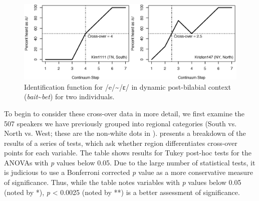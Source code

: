\documentclass[output=paper]{LSP/langsci}
\begin{document}
\begin{figure}[t]
\includegraphics[width=\textwidth]{illustrations/kend_frid_fig2}
\caption{Identification function for /e/{\textasciitilde}/ɛ/ in dynamic post-bilabial context (\textit{bait}{\textasciitilde}\textit{bet}) for two individuals.}
\label{fig:2}
\end{figure}
 
\largerpage
To begin to consider these cross-over data in more detail, we first examine the 507 speakers we have previously grouped into regional categories (South vs. North vs. West; these are the non-white dots in ).  presents a breakdown of the results of a series of  tests, which ask whether region differentiates cross-over points for each variable. The table shows results for Tukey post-hoc tests for the ANOVAs with \textit{p }values below 0.05. Due to the large number of statistical tests, it is judicious to use a Bonferroni corrected \textit{p }value as a more conservative measure of significance. Thus, while the table notes variables with \textit{p }values below 0.05 (noted by *), \textit{p }{\textless} 0.0025 (noted by **) is a better assessment of significance.
\end{document}
